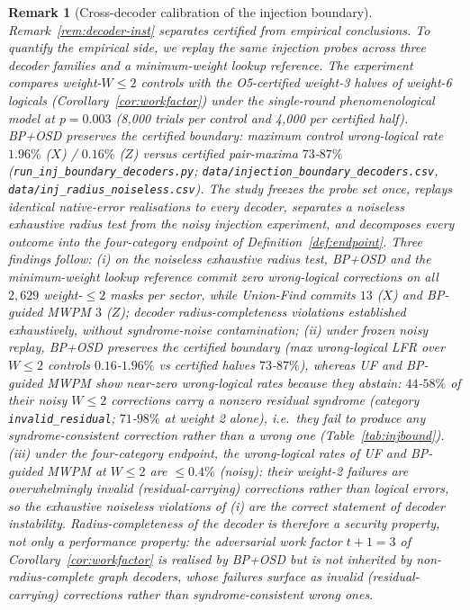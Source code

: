 \documentclass[pdflatex,sn-mathphys-num]{sn-jnl}
\theoremstyle{thmstyleone}
\theoremstyle{thmstyletwo}
\newtheorem{remark}{Remark}
\theoremstyle{thmstylethree}
\begin{document}
\begin{remark}[Cross-decoder calibration of the injection boundary]\label{rem:crossdec}
Remark~\ref{rem:decoder-inst} separates certified from empirical conclusions. To quantify the empirical side, we replay the same injection probes across three decoder families and a minimum-weight lookup reference. The experiment compares weight-$W\le2$ controls with the O5-certified weight-3 halves of weight-6 logicals (Corollary~\ref{cor:workfactor}) under the single-round phenomenological model at $p=0.003$ (8{,}000 trials per control and 4{,}000 per certified half). BP+OSD preserves the certified boundary: maximum control wrong-logical rate $1.96\%$ ($X$) / $0.16\%$ ($Z$) versus certified pair-maxima $73$-$87\%$ (\texttt{run\_inj\_boundary\_decoders.py}; \texttt{data/injection\_boundary\_decoders.csv}, \texttt{data/inj\_radius\_noiseless.csv}). The study freezes the probe set once, replays \emph{identical} native-error realisations to every decoder, separates a noiseless exhaustive radius test from the noisy injection experiment, and decomposes every outcome into the four-category endpoint of Definition~\ref{def:endpoint}. Three findings follow: \emph{(i)} on the noiseless exhaustive radius test, BP+OSD and the minimum-weight lookup reference commit zero wrong-logical corrections on all $2{,}629$ weight-$\le2$ masks per sector, while Union-Find commits $13$ ($X$) and BP-guided MWPM $3$ ($Z$); decoder radius-completeness violations established exhaustively, without syndrome-noise contamination; \emph{(ii)} under frozen noisy replay, BP+OSD preserves the certified boundary (max wrong-logical LFR over $W\le2$ controls $0.16$-$1.96\%$ vs certified halves $73$-$87\%$), whereas UF and BP-guided MWPM show near-zero wrong-logical rates \emph{because they abstain}: $44$-$58\%$ of their noisy $W\le2$ corrections carry a nonzero residual syndrome (category \texttt{invalid\_residual}; $71$-$98\%$ at weight 2 alone), i.e.\ they fail to produce any syndrome-consistent correction rather than a wrong one (Table~\ref{tab:injbound}). \emph{(iii)} under the four-category endpoint, the wrong-logical rates of UF and BP-guided MWPM at $W\le2$ are $\le0.4\%$ (noisy): their weight-2 failures are overwhelmingly invalid (residual-carrying) corrections rather than logical errors, so the exhaustive noiseless violations of (i) are the correct statement of decoder instability. Radius-completeness of the decoder is therefore a \emph{security} property, not only a performance property: the adversarial work factor $t{+}1=3$ of Corollary~\ref{cor:workfactor} is realised by BP+OSD but is not inherited by non-radius-complete graph decoders, whose failures surface as invalid (residual-carrying) corrections rather than syndrome-consistent wrong ones.
\end{remark}
\end{document}
